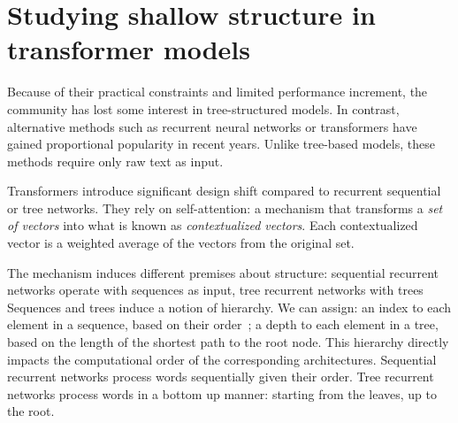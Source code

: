 \setchapterpreamble[u]{\margintoc}
\chapter{Studying shallow structure in transformer models}



Because of their practical constraints and limited performance increment, the community has lost some interest in tree-structured models. In contrast, alternative methods such as recurrent neural networks \parencite{hochreiter_97, cho_14} or transformers \parencite{vaswani_17} have gained proportional popularity in recent years. Unlike tree-based models, these methods require only raw text as input.

Transformers introduce significant design shift compared to recurrent sequential or tree networks. They rely on self-attention: a mechanism that transforms a \textit{set of vectors} into what is known as \textit{contextualized vectors}. Each contextualized vector is a weighted average of the vectors from the original set. 

The mechanism induces different premises about structure: sequential recurrent networks operate with sequences as input, tree recurrent networks with trees
Sequences and trees induce a notion of hierarchy. We can assign: an index to each element in a sequence, based on their order~; a depth to each element in a tree, based on the length of the shortest path to the root node. This hierarchy directly impacts the computational order of the corresponding architectures. Sequential recurrent networks process words sequentially given their order. Tree recurrent networks process words in a bottom up manner: starting from the leaves, up to the root.

